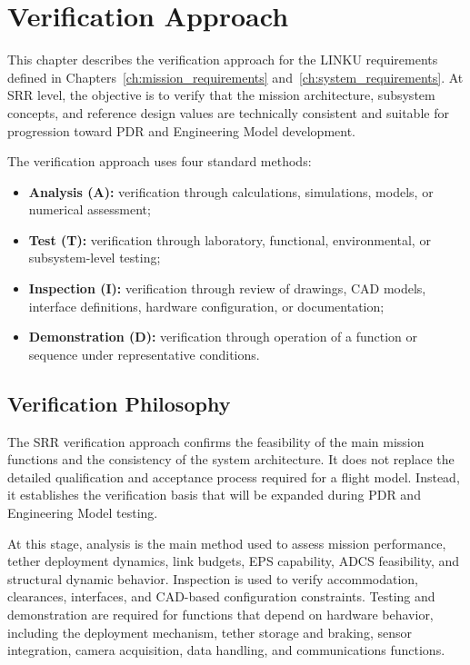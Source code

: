 \chapter{Verification Approach}
\label{ch:verification_approach}

This chapter describes the verification approach for the LINKU requirements defined in Chapters~\ref{ch:mission_requirements} and~\ref{ch:system_requirements}. At SRR level, the objective is to verify that the mission architecture, subsystem concepts, and reference design values are technically consistent and suitable for progression toward PDR and Engineering Model development.

The verification approach uses four standard methods:
\begin{itemize}
    \item \textbf{Analysis (A):} verification through calculations, simulations, models, or numerical assessment;
    \item \textbf{Test (T):} verification through laboratory, functional, environmental, or subsystem-level testing;
    \item \textbf{Inspection (I):} verification through review of drawings, CAD models, interface definitions, hardware configuration, or documentation;
    \item \textbf{Demonstration (D):} verification through operation of a function or sequence under representative conditions.
\end{itemize}

\section{Verification Philosophy}
\label{sec:verification_philosophy}

The SRR verification approach confirms the feasibility of the main mission functions and the consistency of the system architecture. It does not replace the detailed qualification and acceptance process required for a flight model. Instead, it establishes the verification basis that will be expanded during PDR and Engineering Model testing.

At this stage, analysis is the main method used to assess mission performance, tether deployment dynamics, link budgets, EPS capability, ADCS feasibility, and structural dynamic behavior. Inspection is used to verify accommodation, clearances, interfaces, and CAD-based configuration constraints. Testing and demonstration are required for functions that depend on hardware behavior, including the deployment mechanism, tether storage and braking, sensor integration, camera acquisition, data handling, and communications functions.

